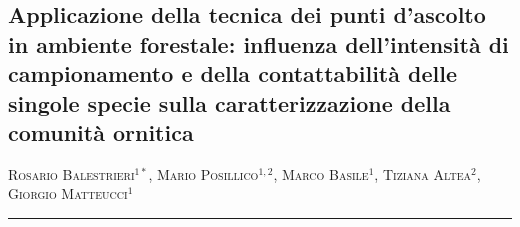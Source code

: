 \setcounter{figure}{0}
\setcounter{table}{0}

\begin{adjustwidth}{-3.5cm}{0cm}
\pagestyle{CIOpage}
\chapter*[Punti d{\textquoteright}ascolto: intensit\`a di
campionamento e contattabilit\`a]{
\textbf{Applicazione della tecnica dei punti d{\textquoteright}ascolto
in ambiente forestale: influenza dell{\textquoteright}intensit\`a di
campionamento e della contattabilit\`a delle singole specie sulla
caratterizzazione della comunit\`a ornitica}}


\textsc{Rosario Balestrieri}$^{1*}$, \textsc{Mario Posillico}$^{1,2}$, 
\textsc{Marco Basile}$^{1}$, \textsc{Tiziana Altea}$^{2}$, 
 \textsc{Giorgio Matteucci}$^{1}$\\
 
      
\noindent\color{MUSEBLUE}\rule{27cm}{2pt}
\vspace{1cm}
\end{adjustwidth}



